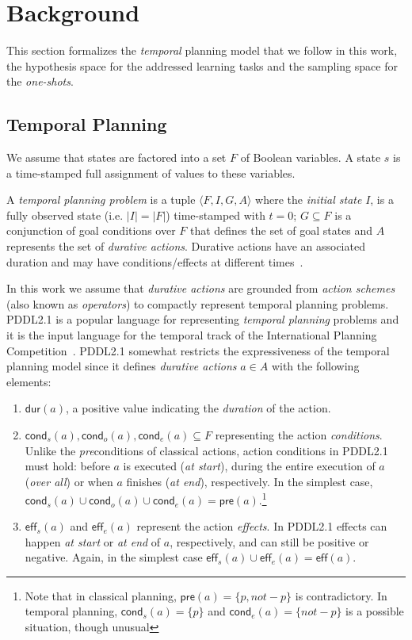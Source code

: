 \documentclass{ecai}
\newcommand{\tup}[1]{{\langle #1 \rangle}}
\newcommand{\pre}{\mathsf{pre}}    %
\newcommand{\eff}{\mathsf{eff}}    %
\newcommand{\cond}{\mathsf{cond}}  %
\newcommand{\dur}{\mathsf{dur}}    %
\begin{document}
\section{Background}
This section formalizes the {\em temporal} planning model that we follow in this work, the hypothesis space for the addressed learning tasks and the sampling space for the {\em one-shots}.

\subsection{Temporal Planning}
\label{sec:temporalplanning}
We assume that states are factored into a set $F$ of Boolean variables. A state $s$ is a time-stamped full assignment of values to these variables. 

A {\em temporal planning problem} is a tuple $\tup{F,I,G,A}$ where the {\em initial state} $I$, is a fully observed state (i.e. $|I|=|F|$) time-stamped with $t=0$; $G \subseteq F$ is a conjunction of goal conditions over $F$ that defines the set of goal states and $A$ represents the set of {\em durative actions}. Durative actions have an associated duration and may have conditions/effects at different times~\cite{vidal2006branching,garrido2009constraint}.

In this work we assume that {\em durative actions} are grounded from {\em action schemes} (also known as {\em operators}) to compactly represent temporal planning problems. PDDL2.1 is a popular language for representing {\em temporal planning} problems and it is the input language for the temporal track of the International Planning Competition~\cite{fox2003pddl2,ghallab2004automated}. PDDL2.1 somewhat restricts the expressiveness of the temporal planning model since it defines {\em durative actions} $a\in A$ with the following elements:
\begin{enumerate}
\item $\dur(a)$, a positive value indicating the {\em duration} of the action.
\item $\cond_s(a), \cond_o(a), \cond_e(a) \subseteq F$ representing the action {\em conditions}. Unlike the \emph{pre}conditions of classical actions, action conditions in PDDL2.1 must hold: before $a$ is executed ({\em at start}), during the entire execution of $a$ ({\em over all}) or when $a$ finishes ({\em at end}), respectively. In the simplest case, $\cond_s(a) \cup \cond_o(a) \cup \cond_e(a) = \pre(a).$\footnote{Note that in classical planning, $\pre(a)=\{p,not-p\}$ is contradictory. In temporal planning, $\cond_s(a)=\{p\}$ and $\cond_e(a)=\{not-p\}$ is a possible situation, though unusual}
\item $\eff_s(a)$ and $\eff_e(a)$ represent the action {\em effects}. In PDDL2.1 effects can happen {\em at start} or {\em at end} of $a$, respectively, and can still be positive or negative. Again, in the simplest case $\eff_s(a) \cup \eff_e(a) = \eff(a)$.
\end{enumerate}
\end{document}
